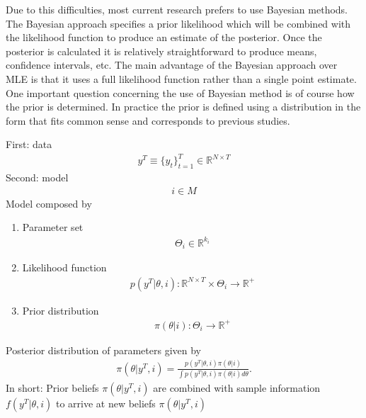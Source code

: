 \documentclass{beamer}
\begin{document}
\begin{frame}
Due to this difficulties, most current research prefers to use Bayesian methods. 
The Bayesian approach specifies a prior likelihood which will be combined with the likelihood function to produce an estimate of the posterior. 
Once the posterior is calculated it is relatively straightforward to produce means, confidence intervals, etc. 
The main advantage of the Bayesian approach over MLE is that it uses a full likelihood function rather than a single point estimate. 
One important question concerning the use of Bayesian method is of course how the prior is determined. 
In practice the prior is defined using a distribution in the form that fits common sense and corresponds to previous studies. 
\end{frame}

\begin{frame}
  First: data
  \begin{align}
    y^T \equiv \{y_t \}^T_{t=1} \in \mathbb{R}^{N\times T}
  \end{align}
  Second: model
  \begin{align}
    i \in M
  \end{align}
  Model composed by
  \begin{enumerate}
    \item Parameter set
    \begin{align}
      \Theta_i \in \mathbb{R}^{k_i}
    \end{align}
    \item Likelihood function
    \begin{align}
      p(y^T | \theta,i): \mathbb{R}^{N\times T} \times \Theta_i \rightarrow \mathbb{R}^+
    \end{align}
    \item Prior distribution
    \begin{align}
      \pi(\theta|i): \Theta_i \rightarrow \mathbb{R}^+
    \end{align}
  \end{enumerate}
\end{frame}

\begin{frame}
 Posterior distribution of parameters given by
 \begin{align}
   \pi(\theta|y^T, i) = \frac{p(y^T|\theta,i)\pi(\theta|i)}{\int p(y^T|\theta,i)\pi(\theta|i)d\theta}.
 \end{align}
  In short: Prior beliefs $\pi(\theta|y^T, i)$ are combined with sample information $f(y^T|\theta,i)$ to arrive at new beliefs $\pi(\theta|y^T,i)$
\end{frame}
\end{document}
